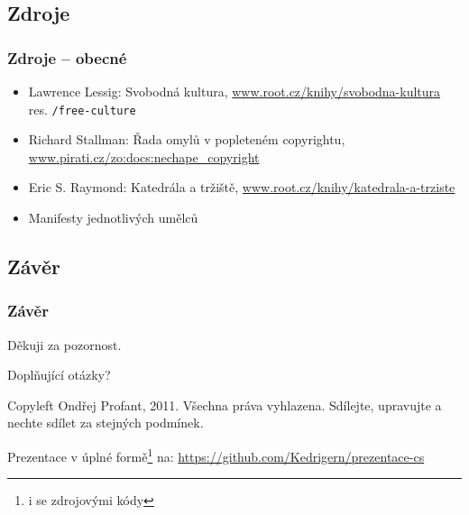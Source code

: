 \documentclass[xetex]{beamer}
\begin{document}
\subsection{Zdroje}
\begin{frame}
  \frametitle{Zdroje -- obecné}
  \begin{itemize}
	\item Lawrence Lessig: Svobodná kultura, \url{www.root.cz/knihy/svobodna-kultura} res. \texttt{/free-culture}
	\item Richard Stallman: Řada omylů v popleteném copyrightu, 
		\url{www.pirati.cz/zo:docs:nechape\_copyright}
	\item Eric S. Raymond: Katedrála a tržiště, \url{www.root.cz/knihy/katedrala-a-trziste}	
	\item Manifesty jednotlivých umělců
  \end{itemize}
\end{frame}

\subsection{Závěr}
\begin{frame}
  \frametitle{Závěr}
	Děkuji za pozornost.

	\bigskip
	
	Doplňující otázky?

\bigskip

\bigskip

\scriptsize
Copyleft Ondřej Profant, 2011. Všechna práva vyhlazena. Sdílejte, upravujte a nechte sdílet za stejných podmínek. 

Prezentace v úplné formě\footnote{i se zdrojovými kódy} na: \url{https://github.com/Kedrigern/prezentace-cs}
\end{frame}
\end{document}
